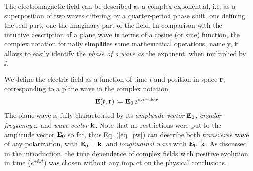The electromagnetic field can be described as a complex exponential, i.e. as a superposition of two waves differing by a quarter-period phase shift, one defining the real part, one the imaginary part of the field. In comparison with the intuitive description of a plane wave in terms of a cosine (or sine) function, the complex notation formally simplifies some mathematical operations, namely, it allows to easily identify the \textit{phase of a wave as} the exponent, when multiplied by $\ii$. 

We define the electric field as a function of time $t$ and position in space ${\mathbf{r}}$, corresponding to a plane wave in the complex notation:
\begin{equation} \mathbf{E}(t, {\mathbf{r}}) := \mathbf{E}_0\, e^{{\mathrm i}\omega t - {\mathrm i}{\mathbf{k}}\cdot{\mathbf{r}}} \label{eq_pw}\end{equation}
The plane wave is fully characterised by its \textit{amplitude vector} $\mathbf{E}_0$, \textit{angular frequency} $\omega$ and \textit{wave vector} ${\mathbf{k}}$. Note that no restrictions were put to the amplitude vector $\mathbf{E}_0$ so far, thus Eq. (\ref{eq_pw}) can describe both \textit{transverse} wave of any polarization, with $\mathbf{E}_0 \perp {\mathbf{k}}$, and \textit{longitudinal wave} with $\mathbf{E}_0 || {\mathbf{k}}$.  As discussed in the introduction, the time dependence of complex fields with positive evolution in time ($e^{+\ii\omega t}$)  was chosen without any impact on the physical conclusions.

